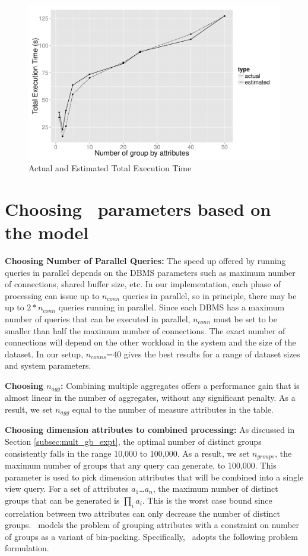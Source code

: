 \begin{figure}[h]
  \centering
    \includegraphics[width=12cm]{Images/total_time_fitted.pdf}
  \caption{Actual and Estimated Total Execution Time} 
    \label{fig:total_time_fitted}
\end{figure}

\section{Choosing \SeeDB\ parameters based on the model}

{\bf Choosing Number of Parallel Queries:} The speed up offered by running
queries in parallel depends on the DBMS parameters such as maximum number of
connections, shared buffer size, etc. In our implementation, each phase of
processing can issue up to $n_{conn}$ queries in parallel, so in principle,
there may be up to $2 \ast n_{conn}$ queries running in parallel. Since each
DBMS has a maximum number of queries that can be executed in parallel,
$n_{conn}$ must be set to be smaller than half the maximum number of
connections. The exact number of connections will depend on the other workload
in the system and the size of the dataset. In our setup, $n_{conns}$=40 gives
the best results for a range of dataset sizes and system parameters.

{\bf Choosing $n_{agg}$:} Combining multiple aggregates offers a performance
gain that is almost linear in the number of aggregates, without any significant
penalty. As a result, we set $n_{agg}$ equal to the number of measure attributes
in the table.

{\bf Choosing dimension attributes to combined processing:}  As discussed in
Section \ref{subsec:mult_gb_expt}, the optimal number of distinct groups
consistently falls in the range 10,000 to 100,000. As a result, we set
$n_{groups}$, the maximum number of groups that any query can generate, to
100,000.
This parameter is used to pick dimension attributes that will be combined into a
single view query. For a set of attributes $a_1$\ldots$a_n$, the maximum number
of distinct groups that can be generated is $\prod_i a_i$. This is the worst
case bound since correlation between two attributes can only decrease the number
of distinct groups. \SeeDB\ models the problem of grouping attributes with a
constraint on number of groups as a variant of bin-packing.
Specifically, \SeeDB\ adopts the following problem formulation.

